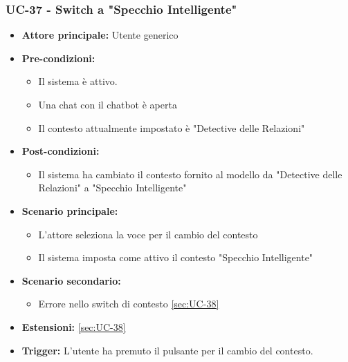 \documentclass[a4paper,12pt]{article}
\begin{document}
\subsubsection{UC-37 - Switch a "Specchio Intelligente"} \label{sec:UC-37}
\begin{itemize}
    \item \textbf{Attore principale:} Utente generico
    \item \textbf{Pre-condizioni:}
    \begin{itemize}
        \item Il sistema è attivo.
        \item Una chat con il chatbot è aperta
        \item Il contesto attualmente impostato è "Detective delle Relazioni"
    \end{itemize}	
    \item \textbf{Post-condizioni:}
    \begin{itemize}
        \item Il sistema ha cambiato il contesto fornito al modello da "Detective delle Relazioni" a "Specchio Intelligente"
    \end{itemize}
    \item \textbf{Scenario principale:} 
    \begin{itemize}
        \item L'attore seleziona la voce per il cambio del contesto
        \item Il sistema imposta come attivo il contesto "Specchio Intelligente"
    \end{itemize}
    \item \textbf{Scenario secondario:} 
    \begin{itemize}
        \item Errore nello switch di contesto \ref{sec:UC-38}
    \end{itemize}
    \item \textbf{Estensioni:} \ref{sec:UC-38}
    \item \textbf{Trigger:} L’utente ha premuto il pulsante per il cambio del contesto.
\end{itemize}
\end{document}
